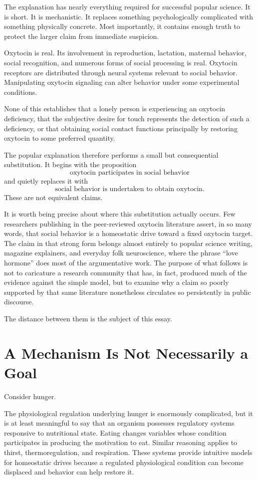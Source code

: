 \documentclass[12pt]{article}
\begin{document}
The explanation has nearly everything required for successful popular science. It is short. It is mechanistic. It replaces something psychologically complicated with something physically concrete. Most importantly, it contains enough truth to protect the larger claim from immediate suspicion.

Oxytocin is real. Its involvement in reproduction, lactation, maternal behavior, social recognition, and numerous forms of social processing is real. Oxytocin receptors are distributed through neural systems relevant to social behavior. Manipulating oxytocin signaling can alter behavior under some experimental conditions.

None of this establishes that a lonely person is experiencing an oxytocin deficiency, that the subjective desire for touch represents the detection of such a deficiency, or that obtaining social contact functions principally by restoring oxytocin to some preferred quantity.

The popular explanation therefore performs a small but consequential substitution. It begins with the proposition
\[
\text{oxytocin participates in social behavior}
\]
and quietly replaces it with
\[
\text{social behavior is undertaken to obtain oxytocin}.
\]
These are not equivalent claims.

It is worth being precise about where this substitution actually occurs. Few researchers publishing in the peer-reviewed oxytocin literature assert, in so many words, that social behavior is a homeostatic drive toward a fixed oxytocin target. The claim in that strong form belongs almost entirely to popular science writing, magazine explainers, and everyday folk neuroscience, where the phrase ``love hormone'' does most of the argumentative work. The purpose of what follows is not to caricature a research community that has, in fact, produced much of the evidence against the simple model, but to examine why a claim so poorly supported by that same literature nonetheless circulates so persistently in public discourse.

The distance between them is the subject of this essay.

\section{A Mechanism Is Not Necessarily a Goal}

Consider hunger.

The physiological regulation underlying hunger is enormously complicated, but it is at least meaningful to say that an organism possesses regulatory systems responsive to nutritional state. Eating changes variables whose condition participates in producing the motivation to eat. Similar reasoning applies to thirst, thermoregulation, and respiration. These systems provide intuitive models for homeostatic drives because a regulated physiological condition can become displaced and behavior can help restore it.
\end{document}
